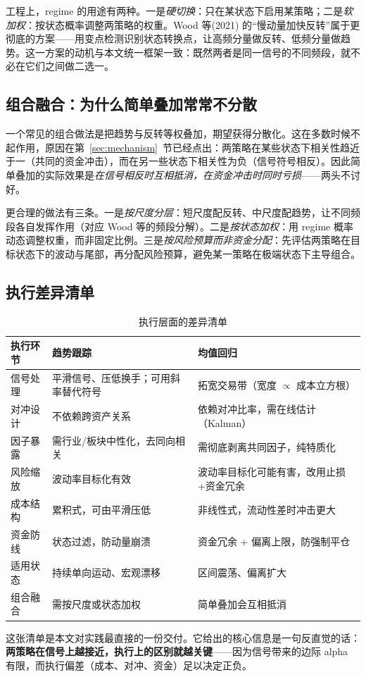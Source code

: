 工程上，regime 的用途有两种。一是\emph{硬切换}：只在某状态下启用某策略；二是\emph{软加权}：按状态概率调整两策略的权重。Wood 等(2021) 的“慢动量加快反转”属于更彻底的方案——用变点检测识别状态转换点，让高频分量做反转、低频分量做趋势\cite{wood2021}。这一方案的动机与本文统一框架一致：既然两者是同一信号的不同频段，就不必在它们之间做二选一。

\subsection{组合融合：为什么简单叠加常常不分散}

一个常见的组合做法是把趋势与反转等权叠加，期望获得分散化。这在多数时候不起作用，原因在第~\ref{sec:mechanism}~节已经点出：两策略在某些状态下相关性趋近于一（共同的资金冲击），而在另一些状态下相关性为负（信号符号相反）。因此简单叠加的实际效果是\emph{在信号相反时互相抵消，在资金冲击时同时亏损}——两头不讨好。

更合理的做法有三条。一是\emph{按尺度分层}：短尺度配反转、中尺度配趋势，让不同频段各自发挥作用（对应 Wood 等的频段分解）。二是\emph{按状态加权}：用 regime 概率动态调整权重，而非固定比例。三是\emph{按风险预算而非资金分配}：先评估两策略在目标状态下的波动与尾部，再分配风险预算，避免某一策略在极端状态下主导组合。

\subsection{执行差异清单}

\begin{table}[htbp]
\centering\footnotesize
\caption{执行层面的差异清单}\label{tab:exec}
\begin{tabular}{@{}>{\raggedright\arraybackslash}p{3.0cm}>{\raggedright\arraybackslash}p{5.9cm}>{\raggedright\arraybackslash}p{5.9cm}@{}}
\toprule
\textbf{执行环节} & \textbf{趋势跟踪} & \textbf{均值回归} \\
\midrule
信号处理 & 平滑信号、压低换手；可用斜率替代符号 & 拓宽交易带（宽度 $\propto$ 成本立方根） \\
对冲设计 & 不依赖跨资产关系 & 依赖对冲比率，需在线估计（Kalman） \\
因子暴露 & 需行业/板块中性化，去同向相关 & 需彻底剥离共同因子，纯特质化 \\
风险缩放 & 波动率目标化有效 & 波动率目标化可能有害，改用止损+资金冗余 \\
成本结构 & 累积式，可由平滑压低 & 非线性式，流动性差时冲击更大 \\
资金防线 & 状态过滤，防动量崩溃 & 资金冗余 + 偏离上限，防强制平仓 \\
适用状态 & 持续单向运动、宏观漂移 & 区间震荡、偏离扩大 \\
组合融合 & 需按尺度或状态加权 & 简单叠加会互相抵消 \\
\bottomrule
\end{tabular}
\end{table}

这张清单是本文对实践最直接的一份交付。它给出的核心信息是一句反直觉的话：\textbf{两策略在信号上越接近，执行上的区别就越关键}——因为信号带来的边际 alpha 有限，而执行偏差（成本、对冲、资金）足以决定正负。
